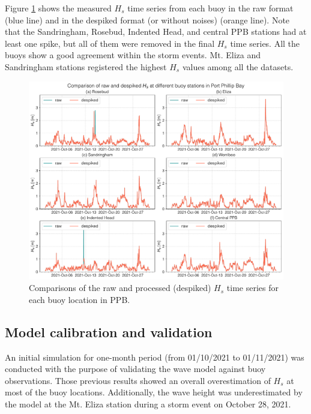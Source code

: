 \documentclass[12pt]{article}
\begin{document}
Figure \ref{fig:pre_processing} shows the  measured $H_{s}$ time series  from each buoy in the raw format (blue line) and in the despiked format (or without noises) (orange line). Note that the Sandringham, Rosebud, Indented Head, and central PPB stations had at least one spike, but all of them were removed in the final $H_{s}$ time series.  All the buoys show a good agreement within the storm events. Mt. Eliza and Sandringham stations registered the highest $H_{s}$ values among all the datasets.

\begin{figure}[h]
    \centering
    \includegraphics[scale=0.5]{plots/maps/buoy_despiked.pdf}
    \caption{Comparisons of the raw and processed (despiked) $H_{s}$ time series for each buoy location in PPB.}
    \label{fig:pre_processing}
\end{figure}

\subsection{Model calibration and validation}

An initial simulation for one-month period (from 01/10/2021 to 01/11/2021) was conducted with the purpose of validating the wave model against buoy observations. Those previous results showed an overall overestimation of $H_{s}$ at most of the buoy locations. Additionally, the wave height was underestimated by the model at the Mt. Eliza station during a storm event on October 28, 2021.

\end{document}

